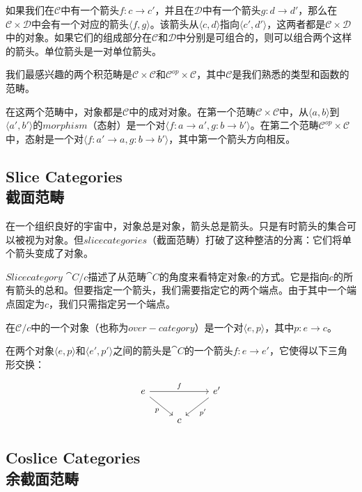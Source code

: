 \documentclass[DaoFP]{subfiles}
\begin{document}
    如果我们在$\mathcal{C}$中有一个箭头$f \colon c \to c'$，并且在$\mathcal{D}$中有一个箭头$g \colon d \to d'$，那么在$\mathcal{C} \times \mathcal{D}$中会有一个对应的箭头$\langle f, g \rangle$。该箭头从$\langle c, d \rangle $指向$\langle c', d' \rangle $，这两者都是$\mathcal{C} \times \mathcal{D}$中的对象。如果它们的组成部分在$\mathcal{C}$和$\mathcal{D}$中分别是可组合的，则可以组合两个这样的箭头。单位箭头是一对单位箭头。

    我们最感兴趣的两个积范畴是$\mathcal{C} \times \mathcal{C}$和$\mathcal{C}^{op} \times \mathcal{C}$，其中$\mathcal{C}$是我们熟悉的类型和函数的范畴。

    在这两个范畴中，对象都是$\mathcal{C}$中的成对对象。在第一个范畴$\mathcal{C} \times \mathcal{C}$中，从$\langle a, b \rangle $到$\langle a', b' \rangle $的$morphism$（态射）是一个对$\langle f \colon a \to a', g \colon b \to b' \rangle $。在第二个范畴$\mathcal{C}^{op} \times \mathcal{C}$中，态射是一个对$\langle f \colon a' \to a, g \colon b \to b' \rangle $，其中第一个箭头方向相反。

    \subsection{Slice Categories\\截面范畴}

    在一个组织良好的宇宙中，对象总是对象，箭头总是箭头。只是有时箭头的集合可以被视为对象。但$slice categories$（截面范畴）打破了这种整洁的分离：它们将单个箭头变成了对象。

    $Slice category$ $\cat C/c$描述了从范畴$\cat C$的角度来看特定对象$c$的方式。它是指向$c$的所有箭头的总和。但要指定一个箭头，我们需要指定它的两个端点。由于其中一个端点固定为$c$，我们只需指定另一个端点。

    在$\mathcal{C}/c$中的一个对象（也称为$over-category$）是一个对$\langle e, p \rangle$，其中$p \colon e \to c$。

    在两个对象$\langle e, p \rangle$和$\langle e', p' \rangle$之间的箭头是$\cat C$的一个箭头$f \colon e \to e'$，它使得以下三角形交换：

    \[
        \begin{tikzcd}
            e
            \arrow[rd, "p"']
            \arrow[rr, "f"]
            && e'
            \arrow[ld, "p'"]
            \\
            &c
        \end{tikzcd}
    \]

    \subsection{Coslice Categories\\余截面范畴}
\end{document}
